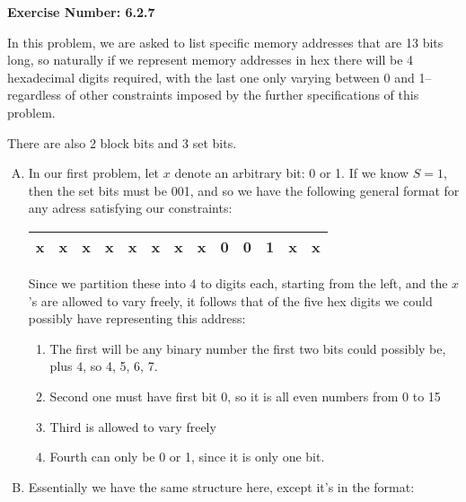 \documentclass{article}
\begin{document}
\noindent \textbf{Exercise Number: 6.2.7}  %

\medskip 

\noindent In this problem, we are asked to list specific memory addresses that are 13 bits long, 
so naturally if we represent memory addresses in hex there will be 4 hexadecimal digits
required, with the last one only varying between 0 and 1--regardless of other constraints
imposed by the further specifications of this problem.

There are also 2 block bits and 3 set bits.

\begin{enumerate}[A.]

\item In our first problem, let $x$ denote an arbitrary bit: 0 or 1. If we know $S = 1$, then the
set bits must be 001, and so we have the following general format for any adress satisfying our
constraints: 

\begin{center}
  \begin{tabular}{*{13}{|c} |}
    
    \hline
    x  & x & x & x & x & x & x & x  & 0  & 0  & 1 & x & x     \\ \hline
  \end{tabular}
\end{center}

Since we partition these into 4 to digits each, starting from the left, and the $x$'s are allowed
to vary freely, it follows that of the five hex digits we could possibly have representing this
address:

\begin{enumerate}

\item The first will be any binary number the first two bits could possibly be, plus $4$, so
4, 5, 6, 7.

\item Second one must have first bit 0, so it is all even numbers from 0 to 15

\item Third is allowed to vary freely

\item Fourth can only be 0 or 1, since it is only one bit. 

\end{enumerate}

\item Essentially we have the same structure here, except it's in the format:


\end{enumerate}
\end{document}

